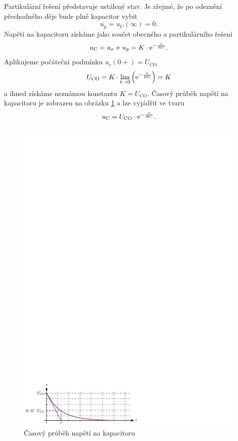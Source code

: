 Partikulární řešení představuje ustálený stav. Je zřejmé, že po odeznění přechodného děje bude plně kapacitor vybit
$$
u_p = u_\mathrm{C}(\infty) = 0.
$$
Napětí na kapacitoru získáme jako součet obecného a partikulárního řešení
$$
u_\mathrm{C} = u_o + u_p = K \cdot \mathrm{e}^{-\frac{t}{RC}}.
$$
Aplikujeme počáteční podmínku $u_c(0+) = U_\mathrm{CO}$
$$
U_\mathrm{CO} = K \cdot \lim_{t \rightarrow 0} \left( \mathrm{e}^{-\frac{t}{RC}} \right) = K
$$
a ihned získáme neznámou konstantu $K = U_\mathrm{CO}$. Časový průběh napětí na kapacitoru je zobrazen na obrázku \ref{fig:prvni_rad_rc_graf_u} a lze vyjádřit ve tvaru
\begin{equation}
u_\mathrm{C} = U_\mathrm{CO} \cdot \mathrm{e}^{-\frac{t}{RC}}.
\label{eq:prvni_rad_rc_u}
\end{equation}
\begin{figure}[h!]
\centering
\includegraphics[]{prechodne_jevy/prvni_rad/rc_graf_u.pdf}
\caption{Časový průběh napětí na kapacitoru}
\label{fig:prvni_rad_rc_graf_u}
\end{figure}

